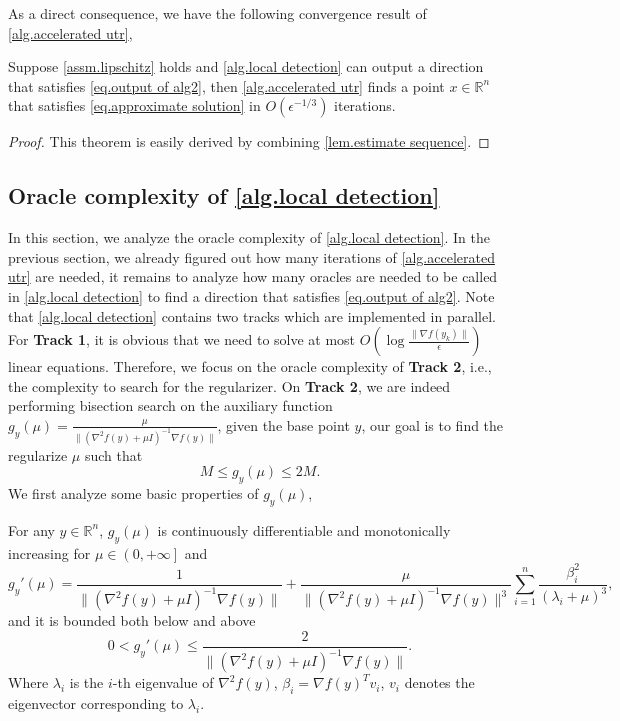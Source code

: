 \documentclass{article}
\begin{document}
As a direct consequence, we have the following convergence result of \autoref{alg.accelerated utr},
\begin{theorem}
    \label{thm.convergence outer loop}
    Suppose \autoref{assm.lipschitz} holds and \autoref{alg.local detection} can output a direction that satisfies \eqref{eq.output of alg2}, then \autoref{alg.accelerated utr} finds a point $x\in\mathbb{R}^n$ that satisfies \eqref{eq.approximate solution} in $O(\epsilon^{-1/3})$ iterations.
\end{theorem}
\begin{proof}
    This theorem is easily derived by combining \autoref{lem.estimate sequence}.
\end{proof}
\subsection{Oracle complexity of \autoref{alg.local detection}}\label{sec.bisection}
In this section, we analyze the oracle complexity of \autoref{alg.local detection}. In the previous section, we already figured out how many iterations of \autoref{alg.accelerated utr} are needed, it remains to analyze how many oracles are needed to be called in \autoref{alg.local detection} to find a direction that satisfies \eqref{eq.output of alg2}. Note that \autoref{alg.local detection} contains two tracks which are implemented in parallel. For \textbf{Track 1}, it is obvious that we need to solve at most $O(\log \frac{\|\nabla f(y_k)\|}{\epsilon})$ linear equations. Therefore, we focus on the oracle complexity of \textbf{Track 2}, i.e., the complexity to search for the regularizer.
On \textbf{Track 2}, we are indeed performing bisection search on the auxiliary function $g_y(\mu) = \frac{\mu}{\|\left (\nabla^2 f(y)+\mu I\right)^{-1}\nabla f(y)\|}$, given the base point $y$, our goal is to find the regularize $\mu$ such that 
\begin{equation*}
    M \leq g_y(\mu) \leq 2M.
\end{equation*}
We first analyze some basic properties of $g_y(\mu)$,
\begin{lemma}
    \label{lem.property g}
    For any $y\in \mathbb{R}^n$, $g_y(\mu)$ is continuously differentiable and monotonically increasing for $\mu \in \left (0,+\infty\right ]$ and
    \begin{equation}
        \label{eq.derivative}
        g_y'(\mu) = \frac{1}{\|\left (\nabla ^2 f(y)+\mu I \right)^{-1}\nabla f(y)\|}+\frac{\mu}{\|\left (\nabla ^2 f(y)+\mu I \right)^{-1}\nabla f(y)\|^3}\sum_{i=1}^n\frac{\beta_i^2}{\left (\lambda_i+\mu\right )^3},
    \end{equation}
    and it is bounded both below and above
    \begin{equation}
        \label{eq.derivative bound}
        0< g_y'(\mu) \leq \frac{2}{\|\left (\nabla ^2 f(y)+\mu I \right)^{-1}\nabla f(y)\|}.
    \end{equation}
    Where $\lambda_i$ is the $i$-th eigenvalue of $\nabla ^2 f(y)$, $\beta_i = \nabla f(y)^T v_i$, $v_i$ denotes the eigenvector corresponding to $\lambda_i$.
\end{lemma}
\end{document}
